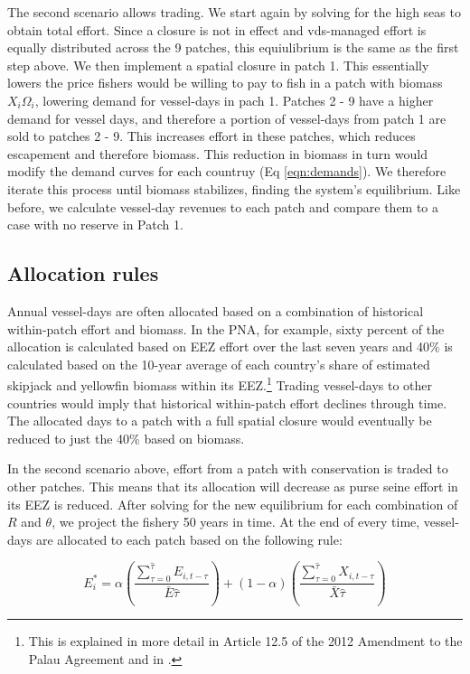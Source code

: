 \documentclass[12pt]{article}
\begin{document}
The second scenario allows trading. We start again by solving for the high seas to obtain total effort. Since a closure is not in effect and vds-managed effort is equally distributed across the 9 patches, this equiulibrium is the same as the first step above. We then implement a spatial closure in patch 1. This essentially lowers the price fishers would be willing to pay to fish in a patch with biomass $X_i\Omega_i$, lowering demand for vessel-days in pach 1. Patches 2 - 9 have a higher demand for vessel days, and therefore a portion of vessel-days from patch 1 are sold to patches 2 - 9. This increases effort in these patches, which reduces escapement and therefore biomass. This reduction in biomass in turn would modify the demand curves for each countruy (Eq \ref{eqn:demands}). We therefore iterate this process until biomass stabilizes, finding the system's equilibrium. Like before, we calculate vessel-day revenues to each patch and compare them to a case with no reserve in Patch 1.

\subsection{Allocation rules}

Annual vessel-days are often allocated based on a combination of historical within-patch effort and biomass. In the PNA, for example, sixty percent of the allocation is calculated based on EEZ effort over the last seven years and 40\% is calculated based on the 10-year average of each country’s share of estimated skipjack and yellowfin biomass within its EEZ.\footnote{This is explained in more detail in Article 12.5 of the 2012 Amendment to the Palau Agreement and in \cite{Hagrannsoknir2014}.} Trading vessel-days to other countries would imply that historical within-patch effort declines through time. The allocated days to a patch with a full spatial closure would eventually be reduced to just the 40\% based on biomass.

In the second scenario above, effort from a patch with conservation is traded to other patches. This means that its allocation will decrease as purse seine effort in its EEZ is reduced. After solving for the new equilibrium for each combination of $R$ and $\theta$, we project the fishery 50 years in time. At the end of every time, vessel-days are allocated to each patch based on the following rule:

$$
E_i^* = \alpha \left(\frac{\sum_{\tau = 0}^{\hat{\tau}}E_{i,t-\tau}}{\bar{E}\hat{\tau}} \right) +
(1 - \alpha) \left(\frac{\sum_{\tau = 0}^{\hat{\tau}}X_{i,t-\tau}}{\bar{X}\hat{\tau}} \right)
$$
\end{document}
